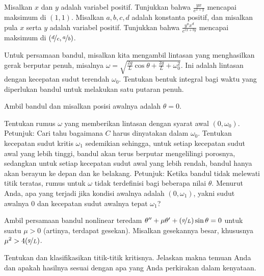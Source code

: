 \begin{exercise}
\leavevmode
\begin{tasks}
\task Misalkan $x$ dan $y$ adalah variabel positif. Tunjukkan bahwa
$\frac{y x}{e^{x+y}}$ mencapai maksimum di $(1,1)$.
\task Misalkan $a,b,c,d$ adalah konstanta positif, dan misalkan pula $x$ serta
$y$ adalah variabel positif. Tunjukkan bahwa
$\frac{y^a x^d}{e^{cx+by}}$ mencapai maksimum di
$(\nicefrac{d}{c},\nicefrac{a}{b})$.
\end{tasks}
\end{exercise}

\begin{exercise}
Untuk persamaan bandul, misalkan kita mengambil lintasan yang menghasilkan
gerak berputar penuh, misalnya
$\omega = \sqrt{\frac{2g}{L} \cos \theta
+ \frac{2g}{L} + \omega_0^2}$. Ini adalah lintasan dengan kecepatan sudut
terendah $\omega_0$. Tentukan bentuk integral bagi waktu yang diperlukan
bandul untuk melakukan satu putaran penuh.
\end{exercise}

\begin{exercise}[menantang]
Ambil bandul dan misalkan posisi awalnya adalah $\theta = 0$.
\begin{tasks}
\task
Tentukan rumus $\omega$ yang memberikan lintasan dengan syarat
awal $(0,\omega_0)$. Petunjuk: Cari tahu bagaimana $C$ harus dinyatakan dalam
$\omega_0$.
\task
Tentukan kecepatan sudut kritis $\omega_1$ sedemikian sehingga, untuk setiap
kecepatan sudut awal yang lebih tinggi, bandul akan terus berputar
mengelilingi porosnya, sedangkan untuk setiap kecepatan sudut awal yang lebih
rendah, bandul hanya akan berayun ke depan dan ke belakang.
Petunjuk: Ketika bandul tidak melewati titik teratas, rumus untuk
$\omega$ tidak terdefinisi bagi beberapa nilai $\theta$.
\task
Menurut Anda, apa yang terjadi jika kondisi awalnya adalah $(0,\omega_1)$,
yakni sudut awalnya 0 dan kecepatan sudut awalnya tepat $\omega_1$?
\end{tasks}
\end{exercise}

\setcounter{exercise}{100}

\begin{exercise}
Ambil persamaan bandul nonlinear teredam $\theta '' + \mu \theta' +
(\nicefrac{g}{L})
\sin \theta = 0$ untuk suatu $\mu > 0$ (artinya, terdapat gesekan).
Misalkan gesekannya besar, khususnya $\mu^2 > 4 (\nicefrac{g}{L})$.
\begin{tasks}
\task
Tentukan dan klasifikasikan titik-titik kritisnya.
\task
Jelaskan makna temuan Anda dan apakah hasilnya sesuai dengan apa yang
Anda perkirakan dalam kenyataan.
\end{tasks}
\end{exercise}

